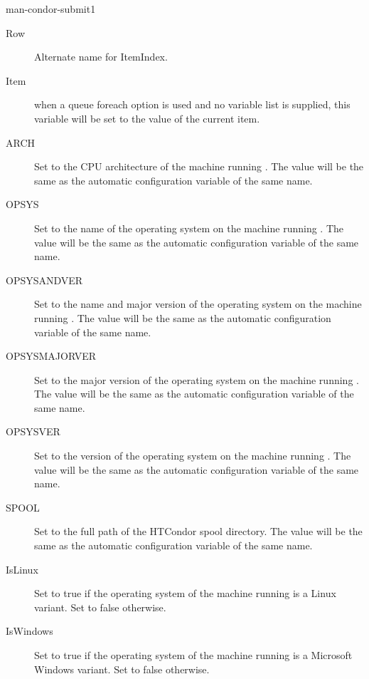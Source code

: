 \begin{ManPage}{}{man-condor-submit}{1}
\begin{description}
\item[Row]
Alternate name for ItemIndex.

\item[Item]
when a queue foreach option is used and no variable list is supplied, this variable will be set to the
value of the current item.
\end{description}



\begin{description}
\item[ARCH]
Set to the CPU architecture of the machine running .
The value will be the same as the automatic configuration variable of the same name.

\item[OPSYS]
Set to the name of the operating system on the machine running .
The value will be the same as the automatic configuration variable of the same name.

\item[OPSYSANDVER]
Set to the name and major version of the operating system on the machine running .
The value will be the same as the automatic configuration variable of the same name.

\item[OPSYSMAJORVER]
Set to the major version of the operating system on the machine running .
The value will be the same as the automatic configuration variable of the same name.

\item[OPSYSVER]
Set to the version of the operating system on the machine running .
The value will be the same as the automatic configuration variable of the same name.

\item[SPOOL]
Set to the full path of the HTCondor spool directory.
The value will be the same as the automatic configuration variable of
the same name.

\item[IsLinux]
Set to true if the operating system of the machine running  is a Linux variant.
Set to false otherwise.

\item[IsWindows]
Set to true if the operating system of the machine running  is a Microsoft Windows variant.
Set to false otherwise.


\end{description}
\end{ManPage}
